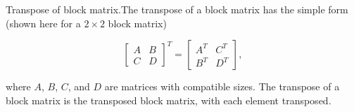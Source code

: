 Transpose of block matrix.The transpose of a block matrix has the simple form (shown here for a \(2\times 2\) block matrix)

\[\left[\begin{array}{cc}A&B\\ C&D\end{array}\right]^{T}=\left[\begin{array}{cc}A^{T}&C^{T}\\ B^{T}&D^{T}\end{array}\right],\]

where \(A\), \(B\), \(C\), and \(D\) are matrices with compatible sizes. The transpose of a block matrix is the transposed block matrix, with each element transposed.

 